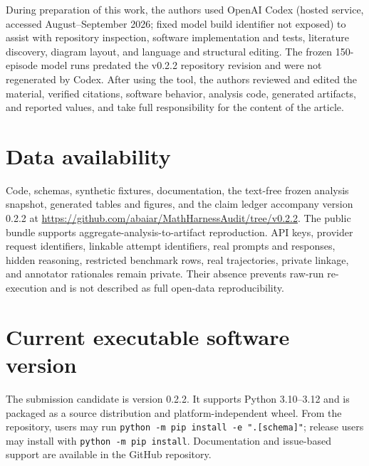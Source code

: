 \documentclass[preprint,12pt,a4paper]{elsarticle}
\begin{document}
During preparation of this work, the authors used OpenAI Codex (hosted service,
accessed August--September 2026; fixed model build identifier not exposed) to
assist with repository inspection, software
implementation and tests, literature discovery, diagram layout, and language and
structural editing. The frozen 150-episode model runs predated the v0.2.2
repository revision and were not regenerated by Codex. After using the tool, the
authors reviewed and edited the material, verified citations, software behavior,
analysis code, generated artifacts, and reported values, and take full
responsibility for the content of the article.

\section*{Data availability}

Code, schemas, synthetic fixtures, documentation, the text-free frozen analysis
snapshot, generated tables and figures, and the claim ledger accompany version
0.2.2 at \url{https://github.com/abaiar/MathHarnessAudit/tree/v0.2.2}. The public bundle
supports aggregate-analysis-to-artifact reproduction. API keys, provider request
identifiers, linkable attempt identifiers, real prompts and responses, hidden
reasoning, restricted benchmark rows, real trajectories, private linkage, and
annotator rationales remain private. Their absence prevents raw-run
re-execution and is not described as full open-data reproducibility.




\section*{Current executable software version}

The submission candidate is version 0.2.2. It supports Python 3.10--3.12 and is
packaged as a source distribution and platform-independent wheel. From the
repository, users may run \texttt{python -m pip install -e ".[schema]"}; release
users may install  with
\texttt{python -m pip install}. Documentation and issue-based support are
available in the GitHub repository.
\end{document}
